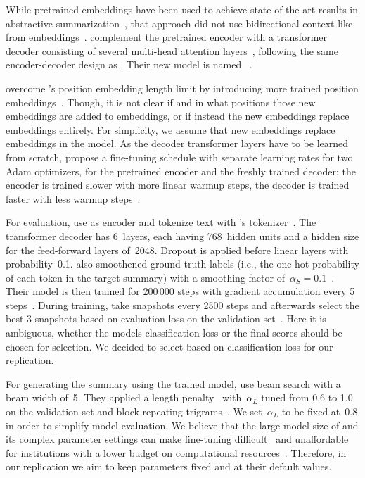 While pretrained \Elmo embeddings have been used to achieve state-of-the-art results in abstractive summarization~\cite{EdunovBA2019}, that approach did not use bidirectional context like from \Bert embeddings~\cite{DevlinCLT2019}. 
\citeauthor{LiuL2019} complement the pretrained \Bert encoder with a transformer decoder consisting of several multi-head attention layers~\cite{LiuL2019,VaswaniSPUJGKP2017}, following the same encoder-decoder design as \textcite{SeeLM2017}. Their new model is named \BertSumAbs~\cite{LiuL2019}.

\citeauthor{LiuL2019} overcome \Bert's position embedding length limit by introducing more trained position embeddings~\cite{LiuL2019}. Though, it is not clear if and in what positions those new embeddings are added to \Bert embeddings, or if instead the new embeddings replace \Bert embeddings entirely. For simplicity, we assume that new embeddings replace \Bert embeddings in the \BertSumAbs model.
As the decoder transformer layers have to be learned from scratch, \citeauthor{LiuL2019} propose a fine-tuning schedule with separate learning rates for two Adam optimizers, for the pretrained \Bert encoder and the freshly trained decoder: the encoder is trained slower with more linear warmup steps, the decoder is trained faster with less warmup steps~\cite{LiuL2019}.

For evaluation, \citeauthor{LiuL2019} use \BertBase as encoder and tokenize text with \Bert's \WordPiece tokenizer~\cite{LiuL2019}.
The transformer decoder has 6~layers, each having 768~hidden units and a hidden size for the feed-forward layers of~2048. Dropout is applied before linear layers with probability~0.1.
\citeauthor{LiuL2019} also smoothened ground truth labels (i.e., the one-hot probability of each token in the target summary) with a smoothing factor of~\(\alpha_S = 0.1\)~\cite{LiuL2019,SzegedyVISW2016}.
Their model is then trained for 200\,000 steps with gradient accumulation every 5 steps~\cite{LiuL2019}.
During training, \citeauthor{LiuL2019} take snapshots every 2500 steps and afterwards select the best 3 snapshots based on evaluation loss on the validation set~\cite{LiuL2019}.
Here it is ambiguous, whether the models classification loss or the final \Rouge scores should be chosen for selection. We decided to select based on classification loss for our replication.

For generating the summary using the trained model, \citeauthor{LiuL2019} use beam search with a beam width of~5. They applied a length penalty~\cite{WuSCLNMKCGMKSJL2016} with~\(\alpha_L\) tuned from 0.6 to 1.0 on the validation set and block repeating trigrams~\cite{PaulusXS2018}.
We set~\(\alpha_L\) to be fixed at~0.8 in order to simplify model evaluation.
We believe that the large model size of \BertSumAbs and its complex parameter settings can make fine-tuning difficult~\cite{AghajanyanSGGZG2020} and unaffordable for institutions with a lower budget on computational resources~\cite{JiaoYSJCL0L2020}.
Therefore, in our replication we aim to keep parameters fixed and at their default values.
